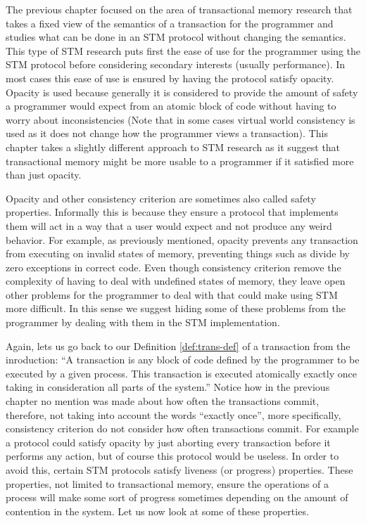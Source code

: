 The previous chapter focused on the area of transactional
memory research that takes a fixed view of the semantics of a transaction for the programmer
and studies what can be done in an STM protocol without changing the semantics.
This type of STM research puts first the ease of use for the programmer using the STM protocol
before considering secondary interests (usually performance).
In most cases this ease of use is ensured by having the protocol satisfy opacity.
Opacity is used because generally it is considered
to provide the amount of safety a programmer would expect from an atomic block of code without having
to worry about inconsistencies
(Note that in some cases virtual world consistency is used as it does not change
how the programmer views a transaction).
This chapter takes a slightly different approach to STM research as it suggest that transactional
memory might be more usable to a programmer if it satisfied more than just opacity.


Opacity and other consistency criterion are sometimes also called safety properties.
Informally this is because they ensure a protocol that implements them will
act in a way that a user would expect and not produce any weird behavior.
For example, as previously mentioned, opacity prevents any transaction from executing on invalid states of memory, preventing
things such as divide by zero exceptions in correct code.
Even though consistency criterion remove the complexity of having to deal with undefined states of memory,
they leave open other problems for the programmer to deal with that could make using STM more difficult.
In this sense we suggest hiding some of these problems from the programmer by dealing with them in the STM
implementation.

Again, lets us go back to our Definition \ref{def:trans-def} of a transaction from the inroduction:
``A transaction is any block of
code defined by the programmer to be executed by a given process.
This transaction is executed atomically exactly once
taking in consideration all parts of the system.''
Notice how in the previous chapter no mention was made about how often the transactions commit,
therefore, not taking into account the words ``exactly once'',
more specifically, consistency criterion do not consider how often transactions commit.
For example a protocol could satisfy opacity by just aborting every transaction before it performs
any action, but of course this protocol would be useless.
In order to avoid this, certain STM protocols satisfy liveness (or progress) properties.
These properties, not limited to transactional memory, ensure the operations of a process
will make some sort of progress sometimes depending on the amount of contention in the system.
Let us now look at some of these properties.

